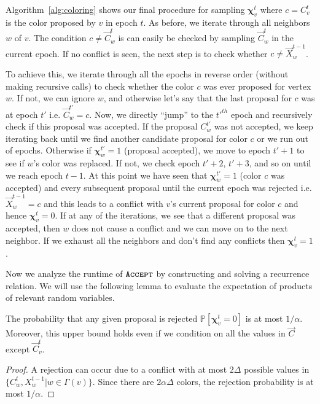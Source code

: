 Algorithm~\ref{alg:coloring} shows our final procedure for sampling $\bm\chi^t_v$ where $c = C^t_v$ is the color proposed by $v$ in epoch $t$.
As before, we iterate through all neighbors $w$ of $v$.
The condition $c\not= \vec C^t_w$ is can easily be checked by sampling $\vec C^t_w$ in the current epoch.
If no conflict is seen, the next step is to check whether $c\not= \vec X^{t-1}_w$.

To achieve this, we iterate through all the epochs in reverse order (without making recursive calls)
to check whether the color $c$ was ever proposed for vertex $w$.
If not, we can ignore $w$, and otherwise let's say that the last proposal for $c$ was at epoch $t'$ i.e. $\vec C^{t'}_w = c$.
Now, we directly ``jump'' to the $t'^{th}$ epoch and recursively check if this proposal was accepted.
If the proposal $C^{t'}_w$ was not accepted, we keep iterating back until we find another candidate proposal for color $c$ or we run out of epochs.
Otherwise if $\bm\chi^{t'}_w = 1$ (proposal accepted), we move to epoch $t'+1$ to see if $w$'s color was replaced.
If not, we check epoch $t'+2$, $t'+3$, and so on until we reach epoch $t-1$.
At this point we have seen that $\bm\chi^{t'}_w = 1$ (color $c$ was accepted) and every subsequent proposal until the current epoch was rejected
i.e. $\vec X^{t-1}_w = c$ and this leads to a conflict with $v$'s current proposal for color $c$ and hence $\bm\chi^t_v = 0$.
If at any of the iterations, we see that a different proposal was accepted, then $w$ does not cause a conflict and we can move on to the next neighbor.
If we exhaust all the neighbors and don't find any conflicts then $\bm\chi^t_v = 1$.

Now we analyze the runtime of $\texttt{\textsc{Accept}}$ by constructing and solving a recurrence relation.
We will use the following lemma to evaluate the expectation of products of relevant random variables.

\begin{lemma}
\label{lem:color_reject_probability}
The probability that any given proposal is rejected $\mathbb P[\bm\chi^t_v=0]$ is at most $1/\alpha$.
Moreover, this upper bound holds even if we condition on all the values in $\vec C$ except $\vec C^t_v$.
\end{lemma}
\begin{proof}
A rejection can occur due to a conflict with at most $2\Delta$ possible values in $\{ C^t_w, X^{t-1}_w | w\in\Gamma(v)\}$.
Since there are $2\alpha\Delta$ colors, the rejection probability is at most $1/\alpha$.
\end{proof}

